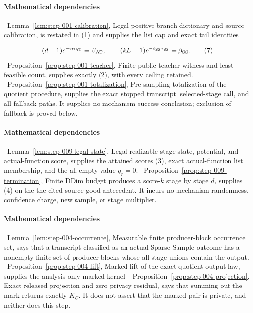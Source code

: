 \paragraph{Mathematical dependencies}

\noindent\textbullet\ Lemma~\ref{lem:step-001-calibration}, Legal positive-branch
  dictionary and source calibration, is restated in (1) and supplies the
  list cap and exact tail identities

  \[
    (d+1)e^{-\eta\tau_{\rm AT}}=\beta_{\rm AT},
    \qquad
    (kL+1)e^{-\varepsilon_{\rm SS}\tau_{\rm SS}}
    =\beta_{\rm SS}.
    \tag{7}
  \]
\noindent\textbullet\ Proposition~\ref{prop:step-001-teacher}, Finite public teacher
  witness and least feasible count, supplies exactly (2), with every
  ceiling retained.
\noindent\textbullet\ Proposition~\ref{prop:step-001-totalization}, Pre-sampling
  totalization of the quotient procedure, supplies the exact stopped
  transcript, selected-stage call, and all fallback paths. It supplies no
  mechanism-success conclusion; exclusion of fallback is proved below.

\paragraph{Mathematical dependencies}

\noindent\textbullet\ Lemma~\ref{lem:step-009-legal-state}, Legal realizable stage
  state, potential, and actual-function score, supplies the attained
  scores (3), exact actual-function list membership, and the all-empty value
  \(q_r=0\).
\noindent\textbullet\ Proposition~\ref{prop:step-009-termination}, Finite DDim
  budget produces a score-\(k\) stage by stage \(d\), supplies (4) on the
  the cited source-good antecedent. It incurs no mechanism randomness,
  confidence charge, new sample, or stage multiplier.

\paragraph{Mathematical dependencies}

\noindent\textbullet\ Lemma~\ref{lem:step-004-occurrence}, Measurable finite
  producer-block occurrence set, says that a transcript classified as an
  actual Sparse Sample outcome has a nonempty finite set of producer blocks
  whose all-stage unions contain the output.
\noindent\textbullet\ Proposition~\ref{prop:step-004-lift}, Marked lift of the exact
  quotient output law, supplies the analysis-only marked kernel.
\noindent\textbullet\ Proposition~\ref{prop:step-004-projection}, Exact released
  projection and zero privacy residual, says that summing out the mark
  returns exactly \(K_C\). It does not assert that the marked pair is
  private, and neither does this step.

